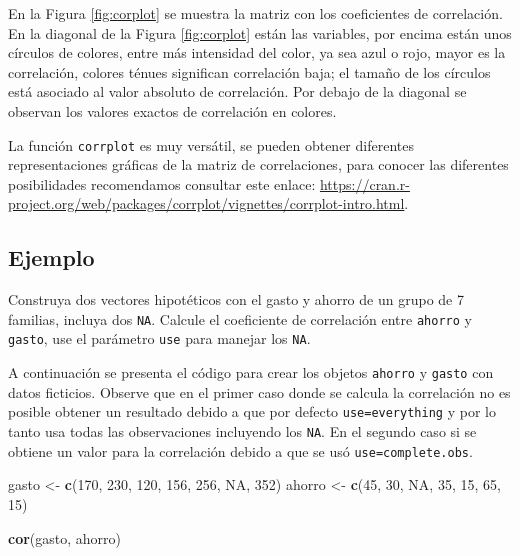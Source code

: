 \documentclass[10pt,]{krantz}
\makeatletter
\newenvironment{Shaded}{\begin{snugshade}}{\end{snugshade}}
\newcommand{\KeywordTok}[1]{\textcolor[rgb]{0.13,0.29,0.53}{\textbf{{#1}}}}
\newcommand{\DecValTok}[1]{\textcolor[rgb]{0.00,0.00,0.81}{{#1}}}
\newcommand{\StringTok}[1]{\textcolor[rgb]{0.31,0.60,0.02}{{#1}}}
\newcommand{\OtherTok}[1]{\textcolor[rgb]{0.56,0.35,0.01}{{#1}}}
\newcommand{\NormalTok}[1]{{#1}}
\newenvironment{kframe}{%
\medskip{}
\setlength{\fboxsep}{.8em}
 \def\at@end@of@kframe{}%
 \ifinner\ifhmode%
  \def\at@end@of@kframe{\end{minipage}}%
  \begin{minipage}{\columnwidth}%
 \fi\fi%
 \def\FrameCommand##1{\hskip\@totalleftmargin \hskip-\fboxsep
 \colorbox{shadecolor}{##1}\hskip-\fboxsep
     \hskip-\linewidth \hskip-\@totalleftmargin \hskip\columnwidth}%
 \MakeFramed {\advance\hsize-\width
   \@totalleftmargin\z@ \linewidth\hsize
   \@setminipage}}%
 {\par\unskip\endMakeFramed%
 \at@end@of@kframe}
\renewenvironment{Shaded}{\begin{kframe}}{\end{kframe}}
\let\BeginKnitrBlock\begin \let\EndKnitrBlock\end
\makeatother
\begin{document}
En la Figura \ref{fig:corplot} se muestra la matriz con los coeficientes
de correlación. En la diagonal de la Figura \ref{fig:corplot} están las
variables, por encima están unos círculos de colores, entre más
intensidad del color, ya sea azul o rojo, mayor es la correlación,
colores ténues significan correlación baja; el tamaño de los círculos
está asociado al valor absoluto de correlación. Por debajo de la
diagonal se observan los valores exactos de correlación en colores.

\BeginKnitrBlock{rmdtip}
La función \texttt{corrplot} es muy versátil, se pueden obtener
diferentes representaciones gráficas de la matriz de correlaciones, para
conocer las diferentes posibilidades recomendamos consultar este enlace:
\url{https://cran.r-project.org/web/packages/corrplot/vignettes/corrplot-intro.html}.
\EndKnitrBlock{rmdtip}

\subsection*{Ejemplo}\label{ejemplo-46}


Construya dos vectores hipotéticos con el gasto y ahorro de un grupo de
7 familias, incluya dos \texttt{NA}. Calcule el coeficiente de
correlación entre \texttt{ahorro} y \texttt{gasto}, use el parámetro
\texttt{use} para manejar los \texttt{NA}.

A continuación se presenta el código para crear los objetos
\texttt{ahorro} y \texttt{gasto} con datos ficticios. Observe que en el
primer caso donde se calcula la correlación no es posible obtener un
resultado debido a que por defecto
\texttt{use=\textquotesingle{}everything\textquotesingle{}} y por lo
tanto usa todas las observaciones incluyendo los \texttt{NA}. En el
segundo caso si se obtiene un valor para la correlación debido a que se
usó \texttt{use=\textquotesingle{}complete.obs\textquotesingle{}}.

\begin{Shaded}
\begin{Highlighting}[]
\NormalTok{gasto <-}\StringTok{ }\KeywordTok{c}\NormalTok{(}\DecValTok{170}\NormalTok{, }\DecValTok{230}\NormalTok{, }\DecValTok{120}\NormalTok{, }\DecValTok{156}\NormalTok{, }\DecValTok{256}\NormalTok{, }\OtherTok{NA}\NormalTok{, }\DecValTok{352}\NormalTok{)}
\NormalTok{ahorro <-}\StringTok{ }\KeywordTok{c}\NormalTok{(}\DecValTok{45}\NormalTok{, }\DecValTok{30}\NormalTok{, }\OtherTok{NA}\NormalTok{, }\DecValTok{35}\NormalTok{, }\DecValTok{15}\NormalTok{, }\DecValTok{65}\NormalTok{, }\DecValTok{15}\NormalTok{)}

\KeywordTok{cor}\NormalTok{(gasto, ahorro)}
\end{Highlighting}
\end{Shaded}
\end{document}
